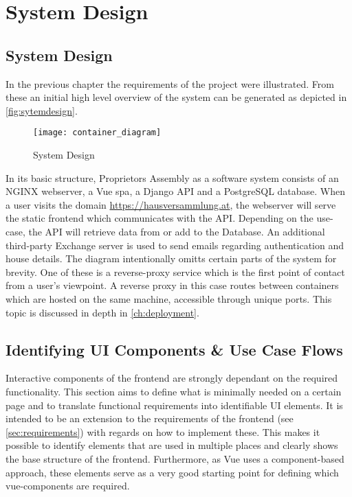 \chapter[System Design]{System Design}

\section{System Design}
In the previous chapter the requirements of the project were illustrated. From these an initial high level overview of the system can be generated as depicted in \autoref{fig:sytemdesign}.


\begin{figure}[H]
    \begin{center}
    \texttt{[image: container\_diagram]}
    \end{center}
    \caption{System Design}
    \label{fig:sytemdesign}
\end{figure}

In its basic structure, Proprietors Assembly as a software system consists of an NGINX webserver, a Vue \acrlong{spa}, a Django API and a PostgreSQL database. When a user visits the domain \url{https://hausversammlung.at}, the webserver will serve the static frontend which communicates with the API. Depending on the use-case, the API will retrieve data from or add to the Database. An additional third-party Exchange server is used to send emails regarding authentication and house details. The diagram intentionally omitts certain parts of the system for brevity. One of these is a reverse-proxy service which is the first point of contact from a user's viewpoint. A reverse proxy in this case routes between containers which are hosted on the same machine, accessible through unique ports. This topic is discussed in depth in \autoref{ch:deployment}.

\section{Identifying UI Components \& Use Case Flows}
Interactive components of the frontend are strongly dependant on the required functionality. This section aims to define what is minimally needed on a certain page and to translate functional requirements into identifiable UI elements. It is intended to be an extension to the requirements of the frontend (see \autoref{sec:requirements}) with regards on how to implement these. This makes it possible to identify elements that are used in multiple places and clearly shows the base structure of the frontend. Furthermore, as Vue uses a component-based approach, these elements serve as a very good starting point for defining which vue-components are required.

